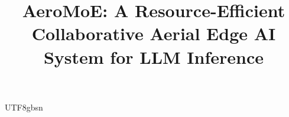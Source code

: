 \documentclass[journal]{IEEEtran}
\begin{document}
\begin{CJK*}{UTF8}{gbsn}

\title{AeroMoE: A Resource-Efficient Collaborative Aerial Edge AI System for LLM Inference}



\end{CJK*}
\end{document}
